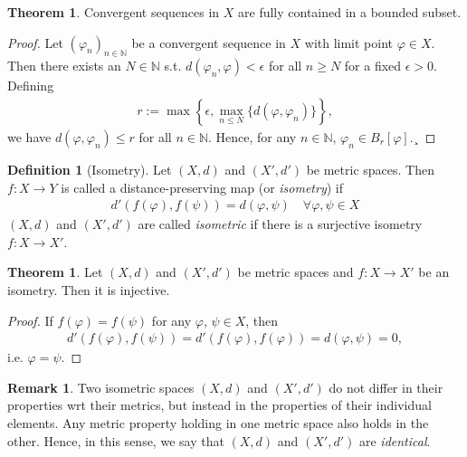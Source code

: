 \documentclass[12pt, a4paper]{article}
\numberwithin{equation}{section}
\theoremstyle{definition}
\theoremstyle{definition}
\newtheorem{defn}[thm]{Definition} %
\newtheorem{remark}[thm]{Remark} %
\newtheorem{theorem}[thm]{Theorem}
\begin{document}
	\begin{theorem}
		Convergent sequences in $X$ are fully contained in a bounded subset.
	\end{theorem}
	
	\begin{proof}
		Let $(\varphi_n)_{n\in\mathbb N}$ be a convergent sequence in $X$ with limit point $\varphi\in X$. Then there exists an $N\in\mathbb N$ s.t. $d(\varphi_n, \varphi) < \epsilon$ for all $n\geq N$ for a fixed $\epsilon > 0$. Defining
		\begin{align}
			r := \max \left\{ \epsilon, \max_{n \leq N}\{d(\varphi, \varphi_n)\} \right\},
		\end{align}
		we have $d(\varphi, \varphi_n) \leq r$ for all $n\in\mathbb N$. Hence, for any $n\in\mathbb N$, 
		$\varphi_n\in B_{r}[\varphi]$.¸
	\end{proof}
	
	\begin{defn}[Isometry]
		Let $(X, d)$ and $(X', d')$ be metric spaces. Then $f: X \rightarrow Y$ is called a distance-preserving map (or \textit{isometry}) if
		\begin{align}
			d'(f(\varphi), f(\psi)) = d(\varphi, \psi) \quad\forall \varphi, \psi\in X
		\end{align}
		$(X, d)$ and $(X', d')$ are called \textit{isometric} if there is a surjective isometry $f:X\rightarrow X'$.
	\end{defn}

	\begin{theorem}\label{thrm:isometries_injective}
		Let $(X, d)$ and $(X', d')$ be metric spaces and $f: X\rightarrow X'$  be an isometry. Then it is injective.
	\end{theorem}

	\begin{proof}
		If $f(\varphi) = f(\psi)$ for any $\varphi$, $\psi\in X$, then 
		\begin{align}
			d'(f(\varphi), f(\psi)) = d'(f(\varphi), f(\varphi)) = d(\varphi, \psi) = 0, 
		\end{align}
		i.e. $\varphi = \psi$.
	\end{proof}

	\begin{remark}
		Two isometric spaces $(X, d)$ and $(X', d')$ do not differ in their properties wrt their metrics, but instead in the properties of their individual elements. Any metric property holding in one metric space also holds in the other. Hence, in this sense, we say that $(X, d)$ and $(X', d')$ are \textit{identical}.
	\end{remark}
	
\end{document}
